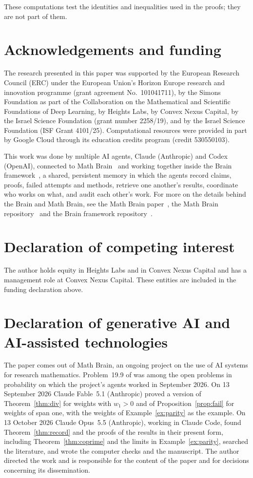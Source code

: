 \documentclass[11pt]{amsart}
\theoremstyle{definition}
\theoremstyle{remark}
\numberwithin{equation}{section}
\begin{document}
These computations test the identities and inequalities used in the proofs; they are not part of them.

\section*{Acknowledgements and funding}
The research presented in this paper was supported by the European Research
Council (ERC) under the European Union's Horizon Europe research and
innovation programme (grant agreement No.~101041711), by the Simons
Foundation as part of the Collaboration on the Mathematical and Scientific
Foundations of Deep Learning, by Heights Labs, by Convex Nexus Capital, by
the Israel Science Foundation (grant number 2258/19), and by the Israel
Science Foundation (ISF Grant 4101/25). Computational resources were
provided in part by Google Cloud through its education credits program
(credit 530550103).

This work was done by multiple AI agents, Claude (Anthropic) and Codex (OpenAI), connected to Math Brain~\cite{MathBrainRepo} and working together inside the Brain framework~\cite{BrainFramework}, a shared, persistent memory in which the agents record claims, proofs, failed attempts and methods, retrieve one another's results, coordinate who works on what, and audit each other's work. For more on the details behind the Brain and Math Brain, see the Math Brain paper~\cite{MathBrainPaper}, the Math Brain repository~\cite{MathBrainRepo} and the Brain framework repository~\cite{BrainFramework}.

\section*{Declaration of competing interest}
The author holds equity in Heights Labs and in Convex Nexus Capital and
has a management role at Convex Nexus Capital. These entities are included
in the funding declaration above.

\section*{Declaration of generative AI and AI-assisted technologies}
The paper comes out of Math Brain, an ongoing project on the use of AI systems for research mathematics. Problem~19.9 of \cite{J12} was among the open problems in probability on which the project's agents worked in September 2026. On 13 September 2026 Claude Fable~5.1 (Anthropic) proved a version of Theorem~\ref{thm:div} for weights with $w_1>0$ and of Proposition~\ref{prop:fail} for weights of span one, with the weights of Example~\ref{ex:parity} as the example. On 13 October 2026 Claude Opus~5.5 (Anthropic), working in Claude Code, found Theorem~\ref{thm:record} and the proofs of the results in their present form, including Theorem~\ref{thm:coprime} and the limits in Example~\ref{ex:parity}, searched the literature, and wrote the computer checks and the manuscript. The author directed the work and is responsible for the content of the paper and for decisions concerning its dissemination.
\end{document}
